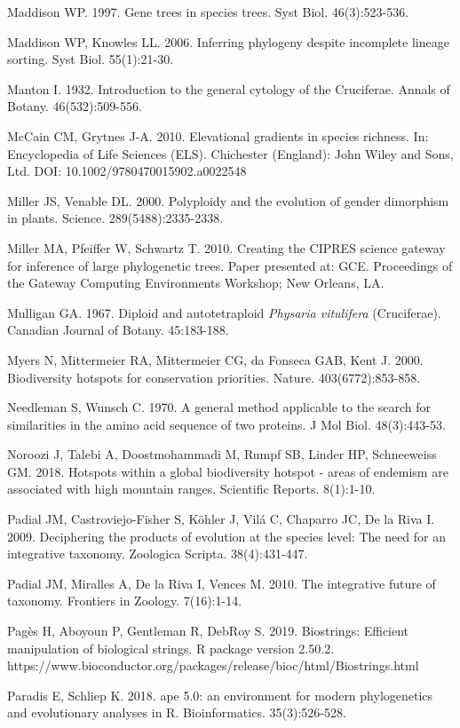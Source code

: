 Maddison WP. 1997. Gene trees in species trees. Syst Biol. 46(3):523-536.

Maddison WP, Knowles LL. 2006. Inferring phylogeny despite incomplete lineage sorting. Syst Biol. 55(1):21-30.

Manton I. 1932. Introduction to the general cytology of the Cruciferae. Annals of Botany. 46(532):509-556.

McCain CM, Grytnes J-A. 2010. Elevational gradients in species richness. In: Encyclopedia of Life Sciences (ELS). Chichester (England): John Wiley and Sons, Ltd.  DOI: 10.1002/9780470015902.a0022548

Miller JS, Venable DL. 2000. Polyploidy and the evolution of gender dimorphism in plants. Science. 289(5488):2335-2338.

Miller MA, Pfeiffer W, Schwartz T. 2010. Creating the CIPRES science gateway for inference of large phylogenetic trees. Paper presented at: GCE. Proceedings of the Gateway Computing Environments Workshop; New Orleans, LA.

Mulligan GA. 1967. Diploid and autotetraploid \textit{Physaria vitulifera} (Cruciferae). Canadian Journal of Botany. 45:183-188.

Myers N, Mittermeier RA, Mittermeier CG, da Fonseca GAB, Kent J. 2000. Biodiversity hotspots for conservation priorities. Nature. 403(6772):853-858.

Needleman S, Wunsch C. 1970. A general method applicable to the search for similarities in the amino acid sequence of two proteins. J Mol Biol. 48(3):443-53.

Noroozi J, Talebi A, Doostmohammadi M, Rumpf SB, Linder HP, Schneeweiss GM. 2018. Hotspots within a global biodiversity hotspot - areas of endemism are associated with high mountain ranges. Scientific Reports. 8(1):1-10.

Padial JM, Castroviejo-Fisher S, Köhler J, Vilá C, Chaparro JC, De la Riva I. 2009. Deciphering the products of evolution at the species level: The need for an integrative taxonomy. Zoologica Scripta. 38(4):431-447.

Padial JM, Miralles A, De la Riva I, Vences M. 2010. The integrative future of taxonomy. Frontiers in Zoology. 7(16):1-14.

Pagès H, Aboyoun P, Gentleman R, DebRoy S. 2019. Biostrings: Efficient manipulation of biological strings. R package version 2.50.2. https://www.bioconductor.org/packages/release/bioc/html/Biostrings.html

Paradis E, Schliep K. 2018. ape 5.0: an environment for modern phylogenetics
and evolutionary analyses in R. Bioinformatics. 35(3):526-528.

